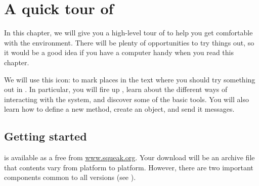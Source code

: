 \documentclass[a4paper,10pt,twoside]{book}
\begin{document}
	\renewcommand{\nnbb}[2]{} %
\fi
\newcommand{\clover}{%
	\raisebox{-0.8ex}[0pt][0pt]{%
		\texttt{[image: cloverleafKey]}}}
\chapter{A quick tour of \sq}
\label{cha:quick}

In this chapter, we will give you a high-level tour of \sq to help you get comfortable with the environment.
There will be plenty of opportunities to try things out, so it would be a good idea if you have a computer handy when you read this chapter.

We will use this icon: \dothisicon{} to mark places in the text where you should try something out in \sq.
In particular, you will fire up \sq, learn about the different ways of interacting with the system, and discover some of the basic tools.
You will also learn how to define a new method, create an object, and send it messages.

\section{Getting started}

\sq is available as a free  from \url{www.squeak.org}.
Your download will be an archive file that contents vary from platform to platform.
However, there are two important components common to all versions (see ).
\end{document}
